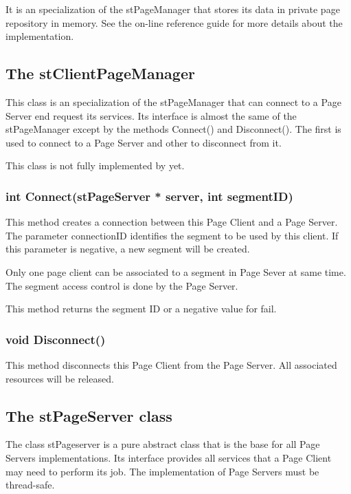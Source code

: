 It is an specialization of the stPageManager that stores its data in private page repository in memory. See the on-line reference guide \cite{onlineman} for more details about the implementation.

\subsection{The stClientPageManager}

This class is an specialization of the stPageManager that can connect to a Page Server end request its services. Its interface is almost the same of the stPageManager except by the methods Connect() and Disconnect(). The first is used to connect to a Page Server and other to disconnect from it.

This class is not fully implemented by \libname{ }yet.

\subsubsection{int Connect(stPageServer * server, int segmentID)}
This method creates a connection between this Page Client and a Page Server. The parameter connectionID identifies the segment to be used by this client. If this parameter is negative, a new segment will be created.

Only one page client can be associated to a segment in Page Sever at same time. The segment access control is done by the Page Server.

This method returns the segment ID or a negative value for fail.

\subsubsection{void Disconnect()}

This method disconnects this Page Client from the Page Server. All associated resources will be released.

\subsection{The stPageServer class}

The class stPageserver is a pure abstract class that is the base for all Page Servers implementations. Its interface provides all services that a Page Client may need to perform its job. The implementation of Page Servers must be thread-safe.

